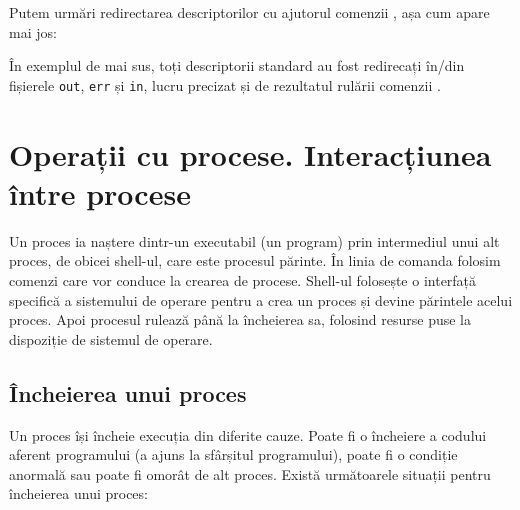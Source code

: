Putem urmări redirectarea descriptorilor cu ajutorul comenzii , așa cum
apare mai jos:


În exemplul de mai sus, toți descriptorii standard au fost redirecați în/din fișierele \texttt{out}, \texttt{err} și \texttt{in}, lucru precizat și de rezultatul rulării comenzii .

\section{Operații cu procese. Interacțiunea între procese}
\label{sec:procese-operatii}

Un proces ia naștere dintr-un executabil (un program) prin intermediul unui alt
proces, de obicei shell-ul, care este procesul părinte. În linia de comanda
folosim comenzi care vor conduce la crearea de procese. Shell-ul folosește o
interfață specifică a sistemului de operare pentru a crea un proces și devine
părintele acelui proces. Apoi procesul rulează până la încheierea sa, folosind
resurse puse la dispoziție de sistemul de operare.

\subsection{Încheierea unui proces}
\label{sec:procese-operatii-incheiere}

Un proces își încheie execuția din diferite cauze. Poate fi o încheiere a
codului aferent programului (a ajuns la sfârșitul programului), poate fi o
condiție anormală sau poate fi omorât de alt proces. Există următoarele situații
pentru încheierea unui proces:

